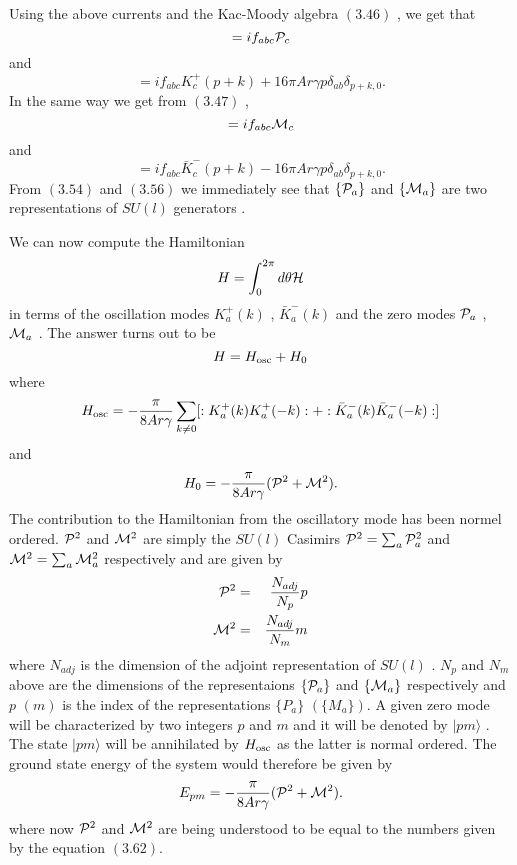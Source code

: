 \documentclass[a4paper,12pt]{article}
\begin{document}
Using the above currents and  the Kac-Moody algebra $(3.46)$ , we get that
\begin{equation}
[{\cal P}_a,{\cal P}_b]=if_{abc}{\cal P}_c
\end{equation}
and
\begin{equation}
[ K^{+}_a(p) , K^{+}_b(k) ]=if_{abc}K^{+}_{c}(p+k) + 
16{\pi}Ar{\gamma}p{\delta}_{ab}{\delta}_{p+k,0}.
\end{equation}
In the same way we get from $(3.47)$ ,
\begin{equation}
[{\cal M}_a,{\cal M}_b]=if_{abc}{\cal M}_c
\end{equation}
and
\begin{equation}
[ {\bar{K}}^{-}_a(p) , {\bar{K}}^{-}_b(k) ]=if_{abc}{\bar{K}}^{-}_{c}(p+k) - 
16{\pi}Ar{\gamma}p{\delta}_{ab}{\delta}_{p+k,0}.
\end{equation}
From $(3.54)$ and $(3.56)$ we immediately 
see that $\{{\cal P}_a\}$ and $\{{\cal M}_a\}$ 
are two representations of $SU(l)$ generators .
 
We can now compute the Hamiltonian 
\begin{equation}
H=\int_{0}^{2{\pi}} d{\theta}{\cal H}
\end{equation}
in terms of the oscillation modes $K^{+}_a(k)$ , $\bar{K}^{-}_a(k)$ and 
the zero modes ${\cal P}_a$ , ${\cal M}_a$ . The answer turns out to be 
\begin{equation}
H=H_{\rm{osc}} +H_0
\end{equation}
where
\begin{equation}
H_{\rm{osc}}=-\frac{{\pi}}{8Ar{\gamma}}\sum_{k{\neq}0}
[:K^{+}_{a}(k)K^{+}_{a}(-k): + :\bar{K}^{-}_{a}(k)\bar{K}^{-}_{a}(-k):]
\end{equation}
and
\begin{equation}
H_0=-\frac{\pi}{8Ar{\gamma}}({\cal P}^2 + {\cal M}^2).
\end{equation}
The contribution to the Hamiltonian from the oscillatory mode has been
normel ordered.
${\cal P}^2$ and ${\cal M}^2$ are simply the $SU(l)$ Casimirs
 $ {\cal P}^2=\sum_{a}{\cal P}_a^2$ and ${\cal M}^2=\sum_{a}{\cal M}_a^2$ 
respectively and are given by \cite{slanski}
\begin{eqnarray}
{\cal P}^2&=&\frac{N_{adj}}{N_{p}}p\nonumber\\ 
{\cal M}^2&=&\frac{N_{adj}}{N_m}m
\end{eqnarray}
where $N_{adj}$ is the dimension of the adjoint representation of $SU(l)$ . 
$N_p$ and $N_m$ above are the dimensions of the representaions 
$\{{\cal P}_{a}\}$ and $\{{\cal M}_{a}\}$ respectively 
and $p$ $(m)$ is  the index of the representations $\{P_a\}$ $(\{M_a\})$. 
A given zero mode will be characterized by two integers $p$ and $m$ and it 
will be denoted by $|pm \rangle $ . The state  $|pm \rangle $ will be
annihilated by $H_{\rm{osc}}$ as the latter is normal ordered.
The ground state energy of the system would therefore be given by
\begin{equation}
E_{pm}=-\frac{\pi}{8Ar{\gamma}}({\cal P}^2 + {\cal M}^2).
\end{equation}
where now ${\cal P}^2$ and ${\cal M}^2$ are being understood 
to be equal to the numbers given by the equation $(3.62)$. 
   
\end{document}
